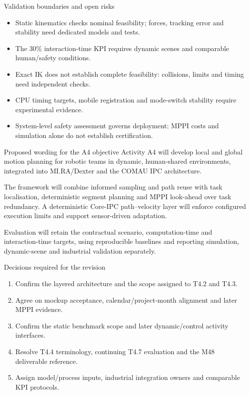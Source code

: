 \documentclass[aspectratio=169,10pt]{beamer}
\begin{document}
\begin{frame}{Validation boundaries and open risks}
\begin{itemize}\items
\item Static kinematics checks nominal feasibility; forces, tracking error and stability need dedicated models and tests.
\item The $30\%$ interaction-time KPI requires dynamic scenes and comparable human/safety conditions.
\item Exact IK does not establish complete feasibility: collisions, limits and timing need independent checks.
\item CPU timing targets, mobile registration and mode-switch stability require experimental evidence.
\item System-level safety assessment governs deployment; MPPI costs and simulation alone do not establish certification.
\end{itemize}
\end{frame}

\begin{frame}{Proposed wording for the A4 objective}
Activity A4 will develop local and global motion planning for robotic teams in dynamic, human-shared environments, integrated into MI.RA/Dexter and the COMAU IPC architecture.\par\medskip
The framework will combine informed sampling and path reuse with task localisation, deterministic segment planning and MPPI look-ahead over task redundancy. A deterministic Core-IPC path--velocity layer will enforce configured execution limits and support sensor-driven adaptation.\par\medskip
Evaluation will retain the contractual scenario, computation-time and interaction-time targets, using reproducible baselines and reporting simulation, dynamic-scene and industrial validation separately.
\end{frame}

\begin{frame}{Decisions required for the revision}
\begin{enumerate}\items
\item Confirm the layered architecture and the scope assigned to T4.2 and T4.3.
\item Agree on mockup acceptance, calendar/project-month alignment and later MPPI evidence.
\item Confirm the static benchmark scope and later dynamic/control activity interfaces.
\item Resolve T4.4 terminology, continuing T4.7 evaluation and the M48 deliverable reference.
\item Assign model/process inputs, industrial integration owners and comparable KPI protocols.
\end{enumerate}
\end{frame}
\end{document}
